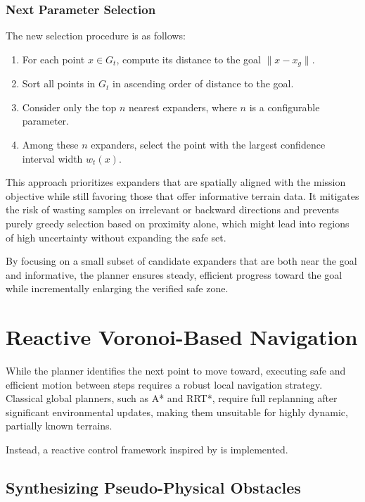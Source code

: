 \subsubsection{Next Parameter Selection}

The new selection procedure is as follows:
\begin{enumerate}
    \item For each point \( x \in G_t \), compute its distance to the goal \( \|x - x_g\| \).
    \item Sort all points in \( G_t \) in ascending order of distance to the goal.
    \item Consider only the top \( n \) nearest expanders, where \( n \) is a configurable parameter.
    \item Among these \( n \) expanders, select the point with the largest confidence interval width \( w_t(x) \).
\end{enumerate}

This approach prioritizes expanders that are spatially aligned with the mission objective while still favoring those that offer informative terrain data. It mitigates the risk of wasting samples on irrelevant or backward directions and prevents purely greedy selection based on proximity alone, which might lead into regions of high uncertainty without expanding the safe set.

By focusing on a small subset of candidate expanders that are both near the goal and informative, the planner ensures steady, efficient progress toward the goal while incrementally enlarging the verified safe zone.

\section{Reactive Voronoi-Based Navigation}
\label{sec:VoronoiNavigation}

While the planner identifies the next point to move toward, executing safe and efficient motion between steps requires a robust local navigation strategy. Classical global planners, such as A* and RRT*, require full replanning after significant environmental updates, making them unsuitable for highly dynamic, partially known terrains.

Instead, a reactive control framework inspired by \textcite{vasilopoulos2021reactivenavigationpartiallyfamiliar} is implemented.

\subsection{Synthesizing Pseudo-Physical Obstacles}

